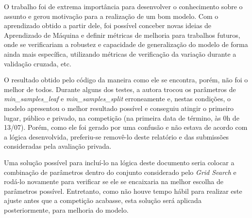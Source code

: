 \documentclass[11pt]{article}
\begin{document}
    O trabalho foi de extrema importância para desenvolver o conhecimento
sobre o assunto e gerou motivação para a realização de um bom modelo.
Com o aprendizado obtido a partir dele, foi possível conceber novas
ideias de Aprendizado de Máquina e definir métricas de melhoria para
trabalhos futuros, onde se verificariam a robustez e capacidade de
generalização do modelo de forma ainda mais específica, utilizando
métricas de verificação da variação durante a validação cruzada, etc.

O resultado obtido pelo código da maneira como ele se encontra, porém,
não foi o melhor de todos. Durante alguns dos testes, a autora trocou os
parâmetros de \emph{min\_samples\_leaf} e \emph{min\_samples\_split}
erroneamente e, nestas condições, o modelo apresentou o melhor resultado
possível e conseguiu atingir o primeiro lugar, público e privado, na
competição (na primeira data de término, às 0h de 13/07). Porém, como
ele foi gerado por uma confusão e não estava de acordo com a lógica
desenvolvida, preferiu-se removê-lo deste relatório e das submissões
consideradas pela avaliação privada.

Uma solução possível para incluí-lo na lógica deste documento seria
colocar a combinação de parâmetros dentro do conjunto considerado pelo
\emph{Grid Search} e rodá-lo novamente para verificar se ele se
encaixaria na melhor escolha de parâmetros possível. Entretanto, como
não houve tempo hábil para realizar este ajuste antes que a competição
acabasse, esta solução será aplicada posteriormente, para melhoria do
modelo.


    
    
    
    
\end{document}
